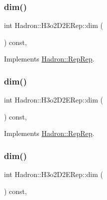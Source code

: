 \subsubsection{\texorpdfstring{dim()}{dim()}\hspace{0.1cm}{\footnotesize\ttfamily [3/5]}}
{\footnotesize\ttfamily int Hadron\+::\+H3o2\+D2\+E\+Rep\+::dim (\begin{DoxyParamCaption}{ }\end{DoxyParamCaption}) const\hspace{0.3cm}{\ttfamily [inline]}, {\ttfamily [virtual]}}



Implements \mbox{\hyperlink{structHadron_1_1RepRep_a92c8802e5ed7afd7da43ccfd5b7cd92b}{Hadron\+::\+Rep\+Rep}}.

\mbox{\label{structHadron_1_1H3o2D2ERep_ad7e811309fce4b8ce92dd11fb8193cb2}} 
\subsubsection{\texorpdfstring{dim()}{dim()}\hspace{0.1cm}{\footnotesize\ttfamily [4/5]}}
{\footnotesize\ttfamily int Hadron\+::\+H3o2\+D2\+E\+Rep\+::dim (\begin{DoxyParamCaption}{ }\end{DoxyParamCaption}) const\hspace{0.3cm}{\ttfamily [inline]}, {\ttfamily [virtual]}}



Implements \mbox{\hyperlink{structHadron_1_1RepRep_a92c8802e5ed7afd7da43ccfd5b7cd92b}{Hadron\+::\+Rep\+Rep}}.

\mbox{\label{structHadron_1_1H3o2D2ERep_ad7e811309fce4b8ce92dd11fb8193cb2}} 
\subsubsection{\texorpdfstring{dim()}{dim()}\hspace{0.1cm}{\footnotesize\ttfamily [5/5]}}
{\footnotesize\ttfamily int Hadron\+::\+H3o2\+D2\+E\+Rep\+::dim (\begin{DoxyParamCaption}{ }\end{DoxyParamCaption}) const\hspace{0.3cm}{\ttfamily [inline]}, {\ttfamily [virtual]}}



